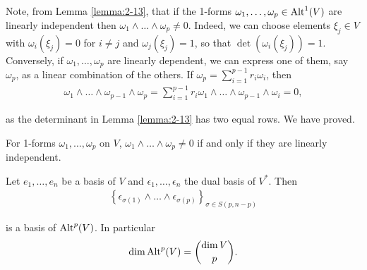 Note, from Lemma \ref{lemma:2-13}, that if the 1-forms $\omega_1, \ldots, \omega_p\in\operatorname{Alt}^1(V)$ 
are linearly independent then $\omega_1\wedge\ldots\wedge\omega_p\neq 0$. Indeed, we can choose 
elements $\xi_j\in V$ with $\omega_i(\xi_j) = 0$ for $i\neq j$ and $\omega_j(\xi_j) = 1$, so that 
$\det(\omega_i(\xi_j)) = 1$. Conversely, if $\omega_1, \ldots, \omega_p$ are linearly dependent,
we can express one of them, say $\omega_p$, as a linear combination of the others. If 
$\omega_p = \sum_{i=1}^{p-1}{r_i\omega_i}$, then
\begin{align*}
  \omega_{1}\wedge\ldots\wedge\omega_{p-1}\wedge\omega_{p}
  = \sum_{i=1}^{p-1}r_{i}\omega_{1}\wedge\ldots\wedge\omega_{p-1}\wedge\omega_{i}=0,
\end{align*}

as the determinant in Lemma \ref{lemma:2-13} has two equal rows. We have proved.



\begin{lemma}
  For 1-forms $\omega_1, \ldots, \omega_p$ on $V$, $\omega_1\wedge\ldots\wedge\omega_p \neq 0$ if and only if
  they are linearly independent.
\end{lemma}

\begin{theorem}\label{theorem:2-15}
Let $e_1, \ldots, e_n$ be a basis of $V$ and $\epsilon_1, \ldots, \epsilon_n$ the dual basis of $V^*$. Then 
\begin{align*}
  \left\{\epsilon_{\sigma(1)}\wedge\ldots\wedge\epsilon_{\sigma(p)}\right\}_{\sigma\in S(p, n-p)}
\end{align*}

is a basis of $\operatorname{Alt}^p(V)$. In particular
\begin{align*}
  \dim\operatorname{Alt}^p(V) = \binom{\dim V}{p}.
\end{align*}
\end{theorem}

